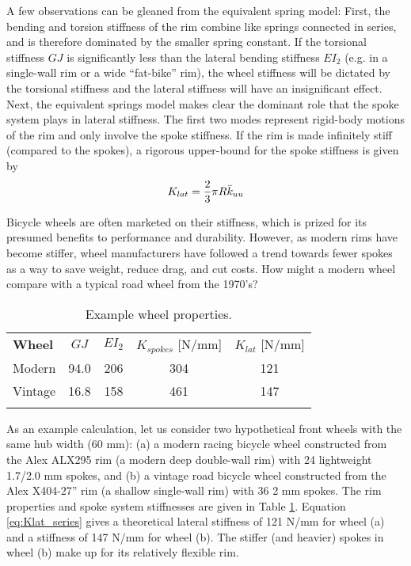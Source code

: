 \documentclass[\rootdir/thesis.tex]{subfiles}
\begin{document}
A few observations can be gleaned from the equivalent spring model: First, the bending and torsion stiffness of the rim combine like springs connected in series, and is therefore dominated by the smaller spring constant. If the torsional stiffness $GJ$ is significantly less than the lateral bending stiffness $EI_2$ (e.g. in a single-wall rim or a wide ``fat-bike'' rim), the wheel stiffness will be dictated by the torsional stiffness and the lateral stiffness will have an insignificant effect. Next, the equivalent springs model makes clear the dominant role that the spoke system plays in lateral stiffness. The first two modes represent rigid-body motions of the rim and only involve the spoke stiffness. If the rim is made infinitely stiff (compared to the spokes), a rigorous upper-bound for the spoke stiffness is given by
\begin{equation}
\label{eq:Klat_stiff_rim}
K_{lat} = \frac{2}{3} \pi R \bar{k}_{uu}
\end{equation}

Bicycle wheels are often marketed on their stiffness, which is prized for its presumed benefits to performance and durability. However, as modern rims have become stiffer, wheel manufacturers have followed a trend towards fewer spokes as a way to save weight, reduce drag, and cut costs. How might a modern wheel compare with a typical road wheel from the 1970's?

\begin{table}[h]
\caption{Example wheel properties.\label{tab:wheels}}
\begin{tabular}{@{}lcccc}
\hline\noalign{\smallskip}
\bf{Wheel} & $GJ$ & $EI_{2}$ & $K_{spokes}$ [N/mm] & $K_{lat}$ [N/mm]\\
\noalign{\smallskip}\hline\noalign{\smallskip}
Modern & 94.0 & 206 & 304 & 121\\
Vintage & 16.8 & 158 & 461 & 147\\
\noalign{\smallskip}\hline
\end{tabular}
\end{table}

As an example calculation, let us consider two hypothetical front wheels with the same hub width (60 mm): (a) a modern racing bicycle wheel constructed from the Alex ALX295 rim (a modern deep double-wall rim) with 24 lightweight 1.7/2.0 mm spokes, and (b) a vintage road bicycle wheel constructed from the Alex X404-27'' rim (a shallow single-wall rim) with 36 2 mm spokes. The rim properties and spoke system stiffnesses are given in Table \ref{tab:wheels}. Equation \eqref{eq:Klat_series} gives a theoretical lateral stiffness of 121 N/mm for wheel (a) and a stiffness of 147 N/mm for wheel (b). The stiffer (and heavier) spokes in wheel (b) make up for its relatively flexible rim.
\end{document}
